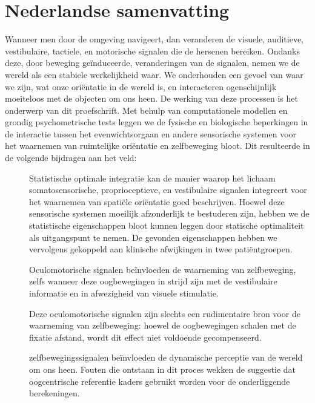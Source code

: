 \clearpage
\pagestyle{empty}

\chapter*{Nederlandse samenvatting}
{}

Wanneer men door de omgeving navigeert, dan veranderen de visuele, auditieve, vestibulaire, tactiele, en motorische signalen die de hersenen bereiken. Ondanks deze, door beweging ge\"induceerde, veranderingen van de signalen, nemen we de wereld als een stabiele werkelijkheid waar. We onderhouden een gevoel van waar we zijn, wat onze ori\"entatie in de wereld is, en interacteren ogenschijnlijk moeiteloos met de objecten om ons heen. De werking van deze processen is het onderwerp van dit proefschrift. Met behulp van computationele modellen en grondig psychometrische tests leggen we de fysische en biologische beperkingen in de interactie tussen het evenwichtsorgaan en andere sensorische systemen voor het waarnemen van ruimtelijke ori\"entatie en zelfbeweging bloot. Dit resulteerde in de volgende bijdragen aan het veld:

\begin{description}
\item[] Statistische optimale integratie kan de manier waarop het lichaam somatosensorische, proprioceptieve, en vestibulaire signalen integreert voor het waarnemen van spati\"ele ori\"entatie goed beschrijven. Hoewel deze sensorische systemen moeilijk afzonderlijk te bestuderen zijn, hebben we de statistische eigenschappen bloot kunnen leggen door statische optimaliteit als uitgangspunt te nemen. De gevonden eigenschappen hebben we vervolgens gekoppeld aan klinische afwijkingen in twee pati\"entgroepen.
\item[] Oculomotorische signalen be\"invloeden de waarneming van zelfbeweging, zelfs wanneer deze oogbewegingen in strijd zijn met de vestibulaire informatie en in afwezigheid van visuele stimulatie.
\item[] Deze oculomotorische signalen zijn slechts een rudimentaire bron voor de waarneming van zelfbeweging: hoewel de oogbewegingen schalen met de fixatie afstand, wordt dit effect niet voldoende gecompenseerd.
\item[] zelfbewegingssignalen be\"invloeden de dynamische perceptie van de wereld om ons heen. Fouten die ontstaan in dit proces wekken de suggestie dat oogcentrische referentie kaders gebruikt worden voor de onderliggende berekeningen.
\end{description}

